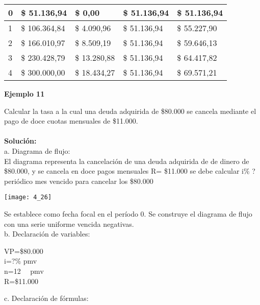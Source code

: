 {\begin{center}
\begin{tabular}{ |p{1.5cm}|p{3cm}|p{2cm}|p{2cm}|p{3cm}| }
0 & \$ 51.136,94    & \$ 0,00       & \$ 51.136,94      & \$ 51.136,94 \\ \hline 

1 & \$ 106.364,84   & \$ 4.090,96   & \$ 51.136,94  & \$ 55.227,90 \\ \hline 

2 & \$ 166.010,97   & \$ 8.509,19   & \$ 51.136,94  & \$ 59.646,13 \\ \hline 

3 & \$ 230.428,79   & \$ 13.280,88  & \$ 51.136,94  & \$ 64.417,82 \\ \hline 

4 & \$ 300.000,00   & \$ 18.434,27  & \$ 51.136,94  & \$ 69.571,21 \\ \hline 

\end{tabular}
\end{center}

\clearpage

\textbf{Ejemplo 11}

\vspace{5mm}

Calcular la tasa a la cual una deuda adquirida de \$80.000 se cancela mediante el pago de doce cuotas mensuales de \$11.000.
\\\\
\textbf{Solución:}
\\
a. Diagrama de flujo:\\

El diagrama representa la cancelación de una deuda adquirida de de dinero de \$80.000, y se cancela en doce pagos mensuales R= \$11.000 se debe calcular i\% ? periódico mes vencido para cancelar los \$80.000

\begin{center}
	\texttt{[image: 4\_26]}
\end{center}

Se establece como fecha focal en el período 0.
Se construye el diagrama de flujo con una serie uniforme vencida negativas.\\

b. Declaración de variables:

\vspace{5mm}
	VP=\$80.000\\
	i=?\% pmv\\
	n=12 \ \ pmv \\
	R=\$11.000
\vspace{5mm}

c. Declaración de fórmulas:

}
